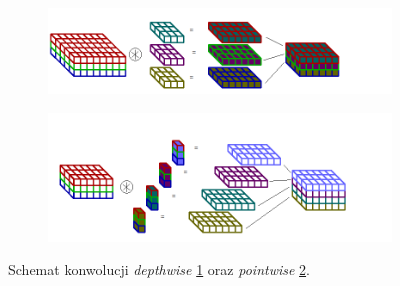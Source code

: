 \begin{figure}
    \centering
    \hfill
    \begin{subfigure}[b]{0.98\textwidth}
    \centering
    \includegraphics[width=\textwidth]{images/dw_conv.png}
    \caption{}
    \label{fig:dw}
    \end{subfigure}
    \hfill
    \begin{subfigure}[b]{0.98\textwidth}
    \centering
    \includegraphics[width=\textwidth]{images/pw_conv.png}
    \caption{}
    \label{fig:pw}
    \end{subfigure}
    
    \caption{Schemat konwolucji \emph{depthwise} \ref{fig:dw} oraz \emph{pointwise} \ref{fig:pw}.}
    \label{fig:dw_pw_schema}
\end{figure}

